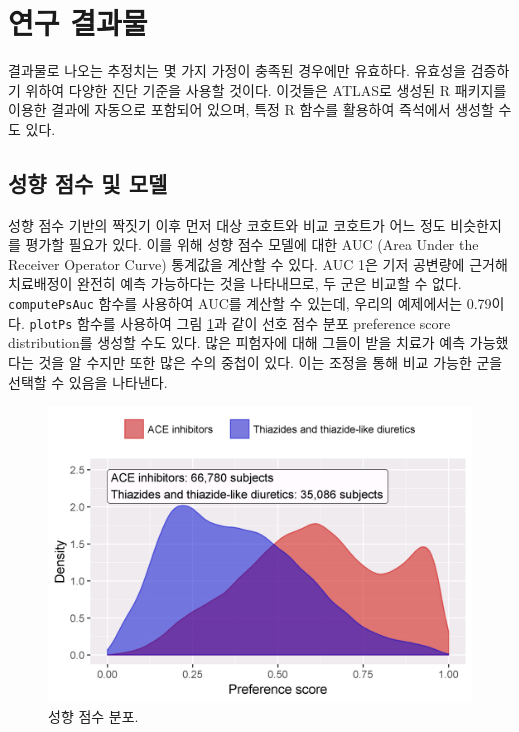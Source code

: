 \documentclass[11pt]{book}
\theoremstyle{definition}
\theoremstyle{definition}
\theoremstyle{definition}
\theoremstyle{remark}
\begin{document}
\section{연구 결과물}\label{studyOutputs}

결과물로 나오는 추정치는 몇 가지 가정이 충족된 경우에만 유효하다.
유효성을 검증하기 위하여 다양한 진단 기준을 사용할 것이다. 이것들은
ATLAS로 생성된 R 패키지를 이용한 결과에 자동으로 포함되어 있으며, 특정 R
함수를 활용하여 즉석에서 생성할 수도 있다.

\subsection{성향 점수 및 모델}\label{---}

성향 점수 기반의 짝짓기 이후 먼저 대상 코호트와 비교 코호트가 어느 정도
비슷한지를 평가할 필요가 있다. 이를 위해 성향 점수 모델에 대한 AUC (Area
Under the Receiver Operator Curve) 통계값을 계산할 수 있다. AUC 1은 기저
공변량에 근거해 치료배정이 완전히 예측 가능하다는 것을 나타내므로, 두
군은 비교할 수 없다. \texttt{computePsAuc} 함수를 사용하여 AUC를 계산할
수 있는데, 우리의 예제에서는 0.79이다. \texttt{plotPs} 함수를 사용하여
그림 \ref{fig:ps}과 같이 선호 점수 분포 preference score distribution를
생성할 수도 있다. 많은 피험자에 대해 그들이 받을 치료가 예측 가능했다는
것을 알 수지만 또한 많은 수의 중첩이 있다. 이는 조정을 통해 비교 가능한
군을 선택할 수 있음을 나타낸다.

\begin{figure}

{\centering \includegraphics[width=0.8\linewidth]{images/PopulationLevelEstimation/ps} 

}

\caption{성향 점수 분포.}\label{fig:ps}
\end{figure}
\end{document}

